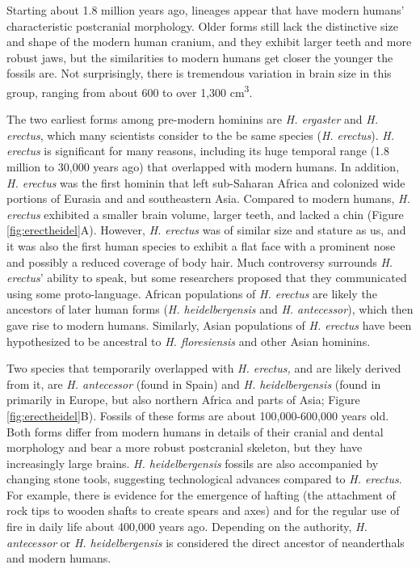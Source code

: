 \documentclass[
]{book}
\begin{document}
Starting about 1.8 million years ago, lineages appear that have modern humans' characteristic postcranial morphology. Older forms still lack the distinctive size and shape of the modern human cranium, and they exhibit larger teeth and more robust jaws, but the similarities to modern humans get closer the younger the fossils are. Not surprisingly, there is tremendous variation in brain size in this group, ranging from about 600 to over 1,300 cm\textsuperscript{3}.

The two earliest forms among pre-modern hominins are \emph{H. ergaster} and \emph{H. erectus}, which many scientists consider to the be same species (\emph{H. erectus}). \emph{H. erectus} is significant for many reasons, including its huge temporal range (1.8 million to 30,000 years ago) that overlapped with modern humans. In addition, \emph{H. erectus} was the first hominin that left sub-Saharan Africa and colonized wide portions of Eurasia and and southeastern Asia. Compared to modern humans, \emph{H. erectus} exhibited a smaller brain volume, larger teeth, and lacked a chin (Figure \ref{fig:erectheidel}A). However, \emph{H. erectus} was of similar size and stature as us, and it was also the first human species to exhibit a flat face with a prominent nose and possibly a reduced coverage of body hair. Much controversy surrounds \emph{H. erectus}' ability to speak, but some researchers proposed that they communicated using some proto-language. African populations of \emph{H. erectus} are likely the ancestors of later human forms (\emph{H. heidelbergensis} and \emph{H. antecessor}), which then gave rise to modern humans. Similarly, Asian populations of \emph{H. erectus} have been hypothesized to be ancestral to \emph{H. floresiensis} and other Asian hominins.

Two species that temporarily overlapped with \emph{H. erectus,} and are likely derived from it, are \emph{H. antecessor} (found in Spain) and \emph{H. heidelbergensis} (found in primarily in Europe, but also northern Africa and parts of Asia; Figure \ref{fig:erectheidel}B). Fossils of these forms are about 100,000-600,000 years old. Both forms differ from modern humans in details of their cranial and dental morphology and bear a more robust postcranial skeleton, but they have increasingly large brains. \emph{H. heidelbergensis} fossils are also accompanied by changing stone tools, suggesting technological advances compared to \emph{H. erectus}. For example, there is evidence for the emergence of hafting (the attachment of rock tips to wooden shafts to create spears and axes) and for the regular use of fire in daily life about 400,000 years ago. Depending on the authority, \emph{H. antecessor} or \emph{H. heidelbergensis} is considered the direct ancestor of neanderthals and modern humans.
\end{document}
